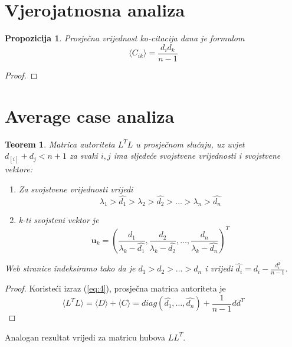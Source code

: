 \documentclass[11pt]{article}
\newtheorem{theorem}{Teorem}[section]
\newtheorem{prop}{Propozicija} [section]
\begin{document}
\section{Vjerojatnosna analiza}
\begin{prop}
Prosječna vrijednost ko-citacija dana je formulom
\begin{equation} \label{eq:4}
\langle C_{ik}\rangle = \frac{d_{i}d_{k}}{n-1}
\end{equation}
\end{prop}
\begin{proof}

\end{proof}

\section{Average case analiza}
\begin{theorem}
Matrica autoriteta $L^{T}L$ u prosječnom slučaju, uz uvjet $d_[i]+d_{j}<n+1$ za svaki $i,j$ ima sljedeće svojstvene vrijednosti i svojstvene vektore:
\begin{enumerate}
\item Za svojstvene vrijednosti vrijedi
\begin{equation}
\lambda_{1} > \hat{d_{1}}>\lambda_{2}>\hat{d_{2}}>\dots >\lambda_{n}>\hat{d_{n}}
\end{equation}
\item k-ti svojsteni vektor je
\begin{equation} 
\textbf{u}_{k}= \left(\frac{d_{1}}{\lambda_{k}-\hat{d_{1}}},\frac{d_{2}}{\lambda_{k}-\hat{d_{2}}},\dots, \frac{d_{n}}{\lambda_{k}-\hat{d_{n}}} \right)^{T}
\end{equation}
\end{enumerate}
Web stranice indeksiramo tako da je $d_{1}>d_{2}>\dots>d_{n}$ i vrijedi $\hat{d_{i}} = d_{i} - \frac{d_{i}^{2}}{n-1}$.
\end{theorem}
\begin{proof}
Koristeći izraz (\ref{eq:4}), prosječna matrica autoriteta je
\begin{equation}
\langle L^{T}L\rangle = \langle D \rangle + \langle C \rangle = diag(\hat{d_{1}}, \dots , \hat{d_{n}}) + \frac{1}{n-1} dd^{T}
\end{equation}
\end{proof}
Analogan rezultat vrijedi za matricu hubova $LL^{T}$.
\end{document}

